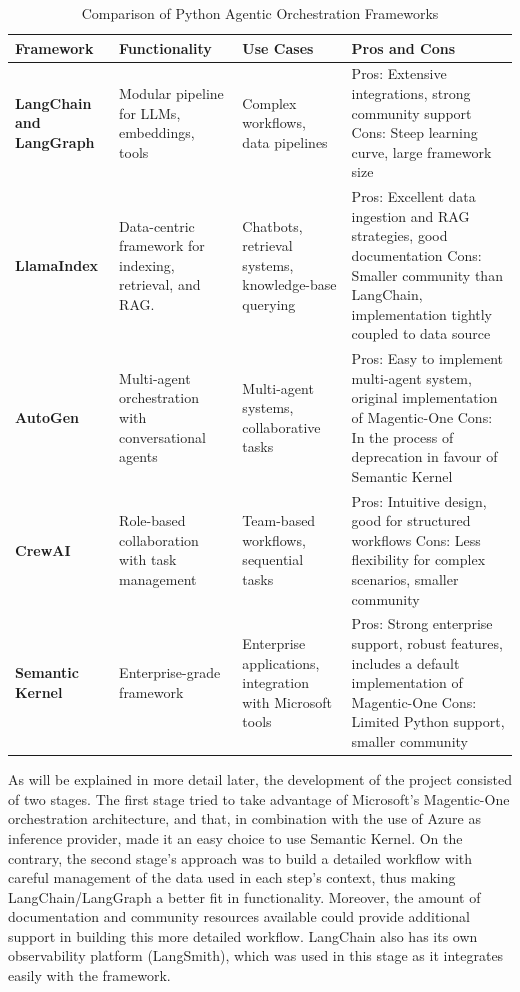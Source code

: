 \documentclass[a4paper]{report}
\begin{document}
\begin{table}[h]
\centering
\begin{tabular}{|p{3cm}|p{3cm}|p{2.5cm}|p{5.5cm}|}
    \hline
    \textbf{Framework} & \textbf{Functionality} & \textbf{Use Cases} & \textbf{Pros and Cons} \\ \hline
    \textbf{LangChain and \newline LangGraph} & Modular pipeline for LLMs, embeddings, tools & Complex workflows, data pipelines & Pros: Extensive integrations, strong community support \newline Cons: Steep learning curve, large framework size \\ \hline
    \textbf{LlamaIndex} & Data-centric framework for indexing, retrieval, and RAG. & Chatbots, retrieval systems, knowledge-base querying & Pros: Excellent data ingestion and RAG strategies, good documentation \newline Cons: Smaller community than LangChain, implementation tightly coupled to data source \\ \hline
    \textbf{AutoGen} & Multi-agent orchestration with conversational agents & Multi-agent systems, collaborative tasks & Pros: Easy to implement multi-agent system, original implementation of Magentic-One \newline Cons: In the process of deprecation in favour of Semantic Kernel \\
    \hline
    \textbf{CrewAI} & Role-based collaboration with task management & Team-based workflows, sequential tasks & Pros: Intuitive design, good for structured workflows \newline Cons: Less flexibility for complex scenarios, smaller community \\
    \hline
    \textbf{Semantic Kernel} & Enterprise-grade framework & Enterprise applications, integration with Microsoft tools & Pros: Strong enterprise support, robust features, includes a default implementation of Magentic-One \newline Cons: Limited Python support, smaller community \\
    \hline
\end{tabular}
\caption{Comparison of Python Agentic Orchestration Frameworks}
\label{tab:orchestration_frameworks_uses}
\end{table}

As will be explained in more detail later, the development of the project consisted of two stages. The first stage tried to take advantage of Microsoft's Magentic-One orchestration architecture, and that, in combination with the use of Azure as inference provider, made it an easy choice to use Semantic Kernel. On the contrary, the second stage's approach was to build a detailed workflow with careful management of the data used in each step's context, thus making LangChain/LangGraph a better fit in functionality. Moreover, the amount of documentation and community resources available could provide additional support in building this more detailed workflow. LangChain also has its own observability platform (LangSmith), which was used in this stage as it integrates easily with the framework.
\end{document}
